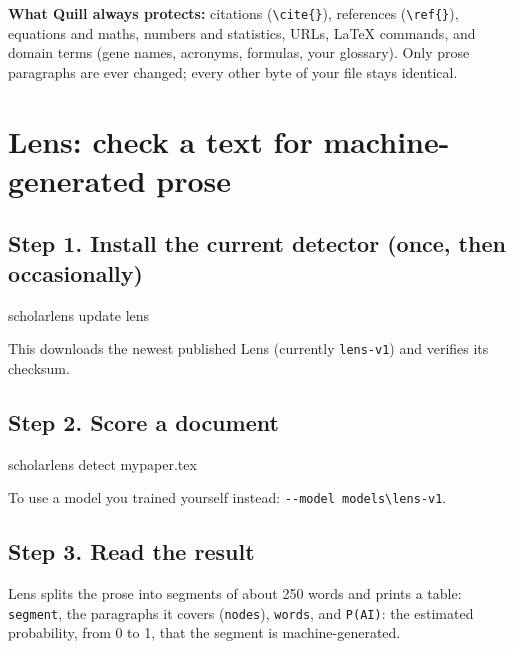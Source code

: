\documentclass[11pt]{article}
\newcommand{\cm}[1]{\texttt{#1}}
\begin{document}
\begin{good}
\textbf{What Quill always protects:} citations (\cm{\textbackslash cite\{\}}), references (\cm{\textbackslash ref\{\}}), equations and maths, numbers and statistics, URLs, LaTeX commands, and domain terms (gene names, acronyms, formulas, your glossary).
Only prose paragraphs are ever changed; every other byte of your file stays identical.
\end{good}

\section{Lens: check a text for machine-generated prose}

\subsection*{Step 1. Install the current detector (once, then occasionally)}
\begin{cmd}
scholarlens update lens
\end{cmd}
This downloads the newest published Lens (currently \cm{lens-v1}) and verifies its checksum.

\subsection*{Step 2. Score a document}
\begin{cmd}
scholarlens detect mypaper.tex
\end{cmd}
To use a model you trained yourself instead: \cm{-{}-model models\textbackslash lens-v1}.

\subsection*{Step 3. Read the result}
Lens splits the prose into segments of about 250 words and prints a table:
\cm{segment}, the paragraphs it covers (\cm{nodes}), \cm{words}, and \cm{P(AI)}: the estimated probability, from 0 to 1, that the segment is machine-generated.
\end{document}
